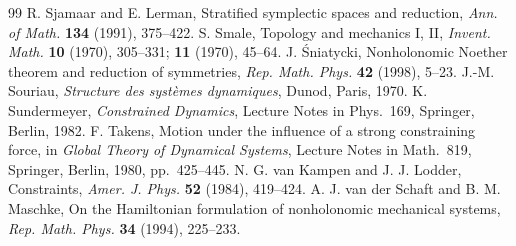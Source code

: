 \documentclass[11pt,a4paper]{article}
\numberwithin{equation}{section}
\theoremstyle{plain}
\theoremstyle{definition}
\theoremstyle{remark}
\begin{document}
\begin{thebibliography}{99}
 R. Sjamaar and E. Lerman, Stratified symplectic spaces and reduction, \emph{Ann. of Math.} \textbf{134} (1991), 375--422.
 S. Smale, Topology and mechanics I, II, \emph{Invent. Math.} \textbf{10} (1970), 305--331; \textbf{11} (1970), 45--64.
 J. \'Sniatycki, Nonholonomic Noether theorem and reduction of symmetries, \emph{Rep. Math. Phys.} \textbf{42} (1998), 5--23.
 J.-M. Souriau, \emph{Structure des syst\`emes dynamiques}, Dunod, Paris, 1970.
 K. Sundermeyer, \emph{Constrained Dynamics}, Lecture Notes in Phys.\ 169, Springer, Berlin, 1982.
 F. Takens, Motion under the influence of a strong constraining force, in \emph{Global Theory of Dynamical Systems}, Lecture Notes in Math.\ 819, Springer, Berlin, 1980, pp.~425--445.
 N. G. van Kampen and J. J. Lodder, Constraints, \emph{Amer. J. Phys.} \textbf{52} (1984), 419--424.
 A. J. van der Schaft and B. M. Maschke, On the Hamiltonian formulation of nonholonomic mechanical systems, \emph{Rep. Math. Phys.} \textbf{34} (1994), 225--233.
\end{thebibliography}
\end{document}
